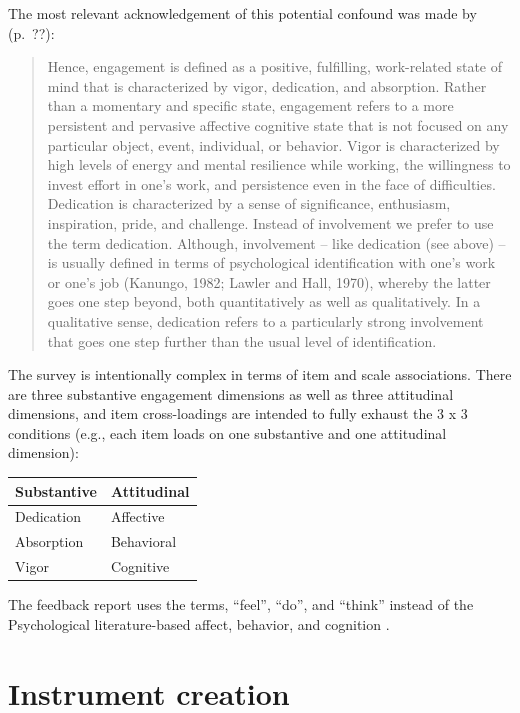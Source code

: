\documentclass[
]{book}
\begin{document}
The most relevant acknowledgement of this potential confound was made by \citet{schaufeli_measurement_2002} (p.~??):

\begin{quote}
Hence, engagement is defined as a positive, fulfilling, work-related state of mind that is characterized by vigor, dedication, and absorption. Rather than a momentary and specific state, engagement refers to a more persistent and pervasive affective cognitive state that is not focused on any particular object, event, individual, or behavior. Vigor is characterized by high levels of energy and mental resilience while working, the willingness to invest effort in one's work, and persistence even in the face of difficulties. Dedication is characterized by a sense of significance, enthusiasm, inspiration, pride, and challenge. Instead of involvement we prefer to use the term dedication. Although, involvement -- like dedication (see above) -- is usually defined in terms of psychological identification with one's work or one's job (Kanungo, 1982; Lawler and Hall, 1970), whereby the latter goes one step beyond, both quantitatively as well as qualitatively. In a qualitative sense, dedication refers to a particularly strong involvement that goes one step further than the usual level of identification.
\end{quote}

The survey is intentionally complex in terms of item and scale associations. There are three substantive engagement dimensions as well as three attitudinal dimensions, and item cross-loadings are intended to fully exhaust the 3 x 3 conditions (e.g., each item loads on one substantive and one attitudinal dimension):

\begin{longtable}[]{@{}ll@{}}
\toprule
Substantive & Attitudinal\tabularnewline
\midrule
\endhead
Dedication & Affective\tabularnewline
Absorption & Behavioral\tabularnewline
Vigor & Cognitive\tabularnewline
\bottomrule
\end{longtable}

The feedback report uses the terms, ``feel'', ``do'', and ``think'' instead of the Psychological literature-based affect, behavior, and cognition \citep[see, for example,][]{eagly_psychology_1993}.

\hypertarget{instrument-creation}{%
\chapter{Instrument creation}\label{instrument-creation}}
\end{document}
